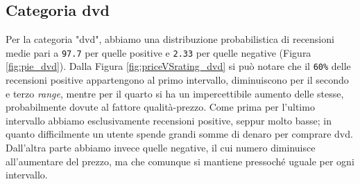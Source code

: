 		
		\subsection{Categoria dvd}
		Per la categoria "dvd", abbiamo una distribuzione probabilistica di recensioni medie pari a \verb|97.7| per quelle positive e \verb|2.33| per quelle negative (Figura \ref{fig:pie_dvd}).
		Dalla Figura \ref{fig:priceVSrating_dvd} si può notare che il \verb|60%| delle recensioni positive appartengono al primo intervallo, diminuiscono per il secondo e terzo \textit{range}, mentre per il quarto si ha un impercettibile aumento delle stesse, probabilmente dovute al fattore qualità-prezzo. Come prima per l'ultimo intervallo abbiamo esclusivamente recensioni positive, seppur molto basse; in quanto difficilmente un utente spende grandi somme di denaro per comprare dvd. Dall'altra parte abbiamo invece quelle negative, il cui numero diminuisce all'aumentare del prezzo, ma che comunque si mantiene pressoché uguale per ogni intervallo.
		
